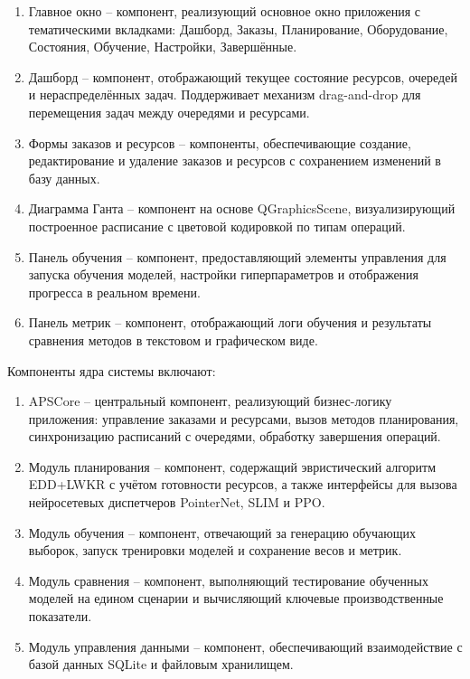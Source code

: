 \begin{enumerate}
\item Главное окно – компонент, реализующий основное окно приложения с тематическими вкладками: Дашборд, Заказы, Планирование, Оборудование, Состояния, Обучение, Настройки, Завершённые.
\item Дашборд – компонент, отображающий текущее состояние ресурсов, очередей и нераспределённых задач. Поддерживает механизм drag-and-drop для перемещения задач между очередями и ресурсами.
\item Формы заказов и ресурсов – компоненты, обеспечивающие создание, редактирование и удаление заказов и ресурсов с сохранением изменений в базу данных.
\item Диаграмма Ганта – компонент на основе QGraphicsScene, визуализирующий построенное расписание с цветовой кодировкой по типам операций.
\item Панель обучения – компонент, предоставляющий элементы управления для запуска обучения моделей, настройки гиперпараметров и отображения прогресса в реальном времени.
\item Панель метрик – компонент, отображающий логи обучения и результаты сравнения методов в текстовом и графическом виде.
\end{enumerate}

Компоненты ядра системы включают:

\begin{enumerate}
\item APSCore – центральный компонент, реализующий бизнес-логику приложения: управление заказами и ресурсами, вызов методов планирования, синхронизацию расписаний с очередями, обработку завершения операций.
\item Модуль планирования – компонент, содержащий эвристический алгоритм EDD+LWKR с учётом готовности ресурсов, а также интерфейсы для вызова нейросетевых диспетчеров PointerNet, SLIM и PPO.
\item Модуль обучения – компонент, отвечающий за генерацию обучающих выборок, запуск тренировки моделей и сохранение весов и метрик.
\item Модуль сравнения – компонент, выполняющий тестирование обученных моделей на едином сценарии и вычисляющий ключевые производственные показатели.
\item Модуль управления данными – компонент, обеспечивающий взаимодействие с базой данных SQLite и файловым хранилищем.
\end{enumerate}

